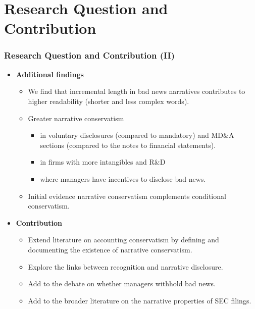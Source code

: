 \documentclass{beamer}
\begin{document}
\section{Research Question and Contribution}

\begin{frame}
\frametitle{Research Question and Contribution (II)}
\begin{itemize}
\item \textbf{Additional findings}
\begin{itemize}
	\item We find that incremental length in bad news narratives contributes to higher readability (shorter and less complex words).\pause
	\item Greater narrative conservatism 
	\begin{itemize}
		\item in voluntary disclosures (compared to mandatory) and MD\&A sections (compared to the notes to financial statements).
		\item in firms with more intangibles and R\&D
		\item where managers have incentives to disclose bad news. \pause
	\end{itemize}
	\item Initial evidence narrative conservatism complements conditional conservatism.
\end{itemize}
	
\pause
	\item \textbf{Contribution}
	
	\begin{itemize}
		\item Extend literature on accounting conservatism by defining and documenting the existence of narrative conservatism.
		\item Explore the links between recognition and narrative disclosure.
		\item Add to the debate on whether managers withhold bad news. 
		\item Add to the broader literature on the narrative properties of SEC filings.
	\end{itemize}
\end{itemize}
\end{frame}
\end{document}
